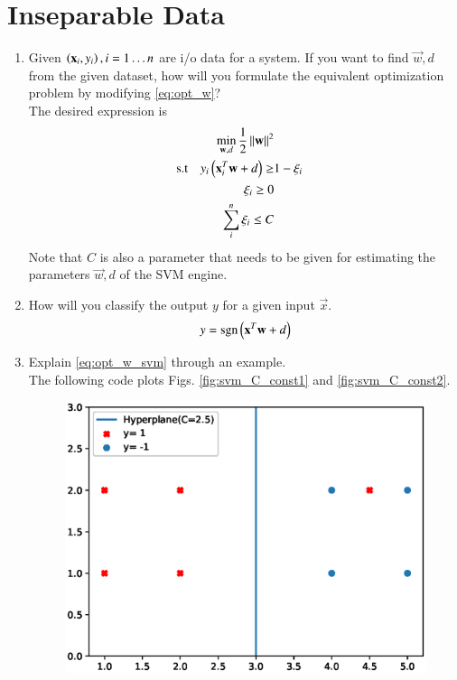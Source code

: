 \documentclass[journal,12pt,twocolumn]{IEEEtran}
\renewcommand\thesection{\arabic{section}}
\begin{document}
\section{Inseparable Data}
\begin{enumerate}[label=\thesection.\arabic*,ref=\thesection.\theenumi]
\item Given $\left(\mathbf{x}_i,y_i\right), i = 1 \dots n$  are i/o data for a system.
If you want 
to find $\vec{w},d$ from the given dataset, how will you formulate the equivalent 
optimization 
problem by modifying \eqref{eq:opt_w}?
\\
\solution The desired expression is
\begin{align}
\label{eq:opt_w_svm}
\min_{\mathbf{w},d}\frac{1}{2}\left\Vert\mathbf{w}\right\Vert^2
\\
\text{s.t} \quad  y_i\left(\mathbf{x}_i^T\mathbf{w}+d\right) \ge& 1 - \xi_i
\\
\xi_i \ge 0
\\
\sum_{i}^{n}\xi_i \le C
\end{align}
Note that $C$ is also a parameter that needs to be given for estimating the parameters $\vec{w}, d$ of the SVM engine.
\item How will you classify the output $y$ for a given input $\vec{x}$.
\\
\solution 
\begin{align}
y = \mathop{\mathrm{sgn}}\left(\mathbf{x}^T\mathbf{w}+d\right)
\end{align}
%
\item Explain  \eqref{eq:opt_w_svm} through an example.
\\
\solution The following code plots Figs. \eqref{fig:svm_C_const1} and \eqref{fig:svm_C_const2}.
\begin{figure}[!ht]
\centering
\includegraphics[width=\columnwidth]{./figs/svm_C_const1.eps}

\end{figure}
\end{enumerate}
\end{document}
